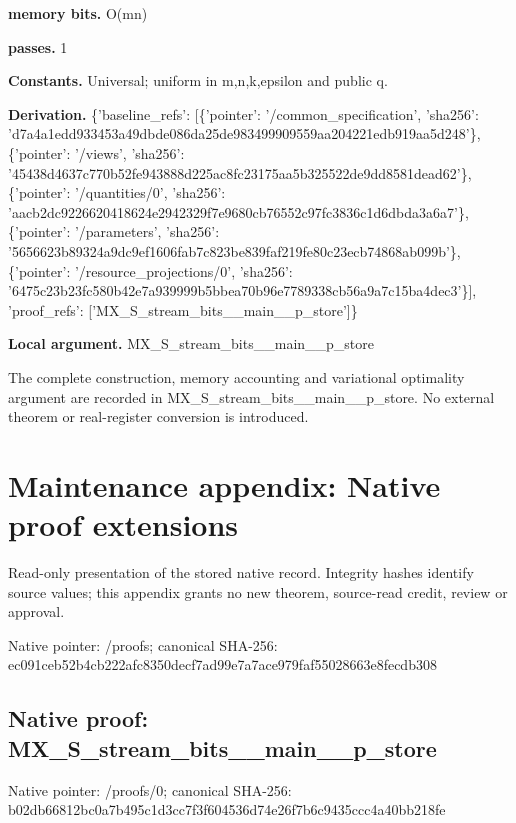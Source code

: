 \documentclass[10pt,a4paper]{article}
\begin{document}
\textbf{memory bits.} O(mn)

\textbf{passes.} 1

\textbf{Constants.} Universal; uniform in m,n,k,epsilon and public q.

\textbf{Derivation.} \{'baseline\_\allowbreak{}refs': [\{'pointer': '/common\_\allowbreak{}specification', 'sha256': 'd7a4a1edd933453a49dbde086da25de983499909559aa204221edb919aa5d248'\}, \{'pointer': '/views', 'sha256': '45438d4637c770b52fe943888d225ac8fc23175aa5b325522de9dd8581dead62'\}, \{'pointer': '/quantities/0', 'sha256': 'aacb2dc9226620418624e2942329f7e9680cb76552c97fc3836c1d6dbda3a6a7'\}, \{'pointer': '/parameters', 'sha256': '5656623b89324a9dc9ef1606fab7c823be839faf219fe80c23ecb74868ab099b'\}, \{'pointer': '/resource\_\allowbreak{}projections/0', 'sha256': '6475c23b23fc580b42e7a939999b5bbea70b96e7789338cb56a9a7c15ba4dec3'\}], 'proof\_\allowbreak{}refs': ['MX\_\allowbreak{}S\_\allowbreak{}stream\_\allowbreak{}bits\_\allowbreak{}\_\allowbreak{}main\_\allowbreak{}\_\allowbreak{}p\_\allowbreak{}store']\}

\textbf{Local argument.} MX\_\allowbreak{}S\_\allowbreak{}stream\_\allowbreak{}bits\_\allowbreak{}\_\allowbreak{}main\_\allowbreak{}\_\allowbreak{}p\_\allowbreak{}store

The complete construction, memory accounting and variational optimality argument are recorded in MX\_\allowbreak{}S\_\allowbreak{}stream\_\allowbreak{}bits\_\allowbreak{}\_\allowbreak{}main\_\allowbreak{}\_\allowbreak{}p\_\allowbreak{}store. No external theorem or real-register conversion is introduced.

\section{Maintenance appendix: Native proof extensions}
Read-only presentation of the stored native record. Integrity hashes identify source values; this appendix grants no new theorem, source-read credit, review or approval.

Native pointer: /proofs; canonical SHA-256: ec091ceb52b4cb222afc8350decf7ad99e7a7ace979faf55028663e8fecdb308

\subsection{Native proof: MX\_\allowbreak{}S\_\allowbreak{}stream\_\allowbreak{}bits\_\allowbreak{}\_\allowbreak{}main\_\allowbreak{}\_\allowbreak{}p\_\allowbreak{}store}
Native pointer: /proofs/0; canonical SHA-256: b02db66812bc0a7b495c1d3cc7f3f604536d74e26f7b6c9435ccc4a40bb218fe
\end{document}
